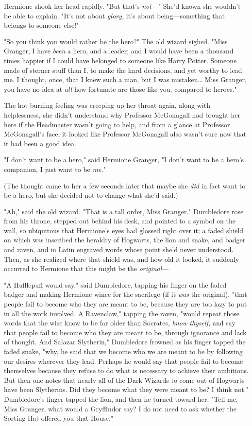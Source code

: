 Hermione shook her head rapidly. "But that's \emph{not}---" She'd known she 
wouldn't be able to explain. "It's not about \emph{glory,} it's about 
being---something that belongs to someone else!"

"So you think you would rather be the hero?" The old wizard sighed. "Miss 
Granger, I have \emph{been} a hero, and a leader; and I would have been a 
thousand times happier if I could have belonged to someone like Harry Potter. 
Someone made of sterner stuff than I, to make the hard decisions, and yet 
worthy to lead me. I thought, once, that I knew such a man, but I was 
mistaken{\ldots} Miss Granger, you have no idea at \emph{all} how fortunate are 
those like you, compared to heroes."

The hot burning feeling was creeping up her throat again, along with 
helplessness, she didn't understand why Professor McGonagall had brought her 
here if the Headmaster wasn't going to help, and from a glance at Professor 
McGonagall's face, it looked like Professor McGonagall also wasn't sure now 
that it had been a good idea.

"I don't want to be a hero," said Hermione Granger, "I don't want to be a 
hero's companion, I just want to be \emph{me.}"

(The thought came to her a few seconds later that maybe she \emph{did} in fact 
want to be a hero, but she decided not to change what she'd said.)

"Ah," said the old wizard. "That is a tall order, Miss Granger." Dumbledore 
rose from his throne, stepped out behind his desk, and pointed to a symbol on 
the wall, so ubiquitous that Hermione's eyes had glossed right over it; a faded 
shield on which was inscribed the heraldry of Hogwarts, the lion and snake, and 
badger and raven, and in Latin engraved words whose point she'd never 
understood. Then, as she realized where that shield was, and how old it looked, 
it suddenly occurred to Hermione that this might be the \emph{original}---

"A Hufflepuff would say," said Dumbledore, tapping his finger on the faded 
badger and making Hermione wince for the sacrilege (if it \emph{was} the 
original), "that people fail to become who they are meant to be, because they 
are too lazy to put in all the work involved. A Ravenclaw," tapping the raven, 
"would repeat those words that the wise know to be far older than Socrates, 
\emph{know thyself,} and say that people fail to become who they are meant to 
be, through ignorance and lack of thought. And Salazar Slytherin," Dumbledore 
frowned as his finger tapped the faded snake, "why, he said that we become who 
we are meant to be by following our desires wherever they lead. Perhaps he 
would say that people fail to become themselves because they refuse to do what 
is necessary to achieve their ambitions. But then one notes that nearly all of 
the Dark Wizards to come out of Hogwarts have been Slytherins. Did they become 
what they were meant to be? I think not." Dumbledore's finger tapped the lion, 
and then he turned toward her. "Tell me, Miss Granger, what would a Gryffindor 
say? I do not need to ask whether the Sorting Hat offered you that House."

